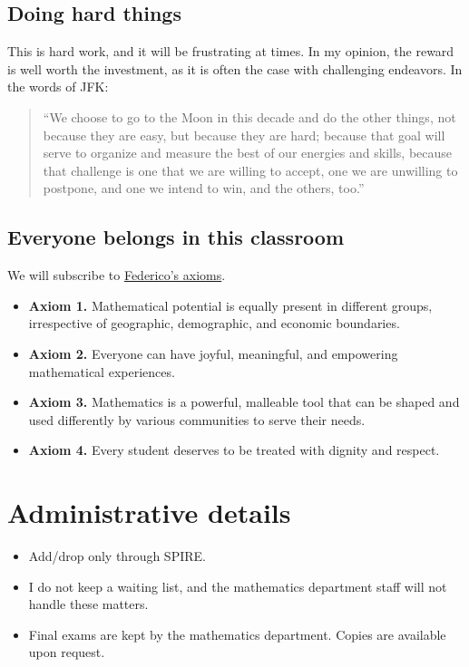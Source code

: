 \documentclass[11pt]{article}
\begin{document}
\subsection*{Doing hard things}
\label{sec:orgdc51c22}
This is hard work, and it will be frustrating at times. In my opinion, the
reward is well worth the investment, as it is often the case with challenging
endeavors. In the words of JFK:
\begin{quote}
``We choose to go to the Moon in this decade and do the other things, not
because they are easy, but because they are hard; because that goal will serve
to organize and measure the best of our energies and skills, because that
challenge is one that we are willing to accept, one we are unwilling to
postpone, and one we intend to win, and the others, too.''
\end{quote}

\subsection*{Everyone belongs in this classroom}
\label{sec:org683af34}
We will subscribe to \href{https://www.ams.org/publications/journals/notices/201610/rnoti-p1164.pdf}{Federico's axioms}.

\begin{itemize}
\item \textbf{Axiom 1.} Mathematical potential is equally present in different groups,
irrespective of geographic, demographic, and economic boundaries.

\item \textbf{Axiom 2.} Everyone can have joyful, meaningful, and empowering mathematical
experiences.

\item \textbf{Axiom 3.} Mathematics is a powerful, malleable tool that can be shaped and
used differently by various communities to serve their needs.

\item \textbf{Axiom 4.} Every student deserves to be treated with dignity and respect.
\end{itemize}

\section*{Administrative details}
\label{sec:org2e956c3}
\begin{itemize}
\item Add/drop only through SPIRE.
\item I do not keep a waiting list, and the mathematics department staff will not
handle these matters.
\item Final exams are kept by the mathematics department. Copies are available upon
request.
\end{itemize}
\end{document}

